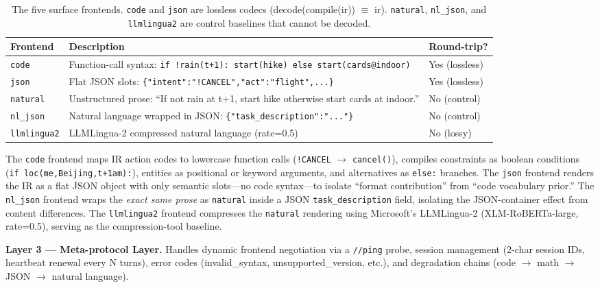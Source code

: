 \documentclass{article}
\begin{document}
\begin{table}[ht]
\centering
\small
\caption{The five surface frontends. \texttt{code} and \texttt{json} are lossless codecs (decode(compile(ir)) $\equiv$ ir). \texttt{natural}, \texttt{nl\_json}, and \texttt{llmlingua2} are control baselines that cannot be decoded.}
\begin{tabular}{lll}
\toprule
Frontend & Description & Round-trip? \\
\midrule
\texttt{code} & Function-call syntax: \texttt{if\ !rain(t+1):\ start(hike)\ else\ start(cards@indoor)} & Yes (lossless) \\
\texttt{json} & Flat JSON slots: \texttt{\{"intent":"!CANCEL","act":"flight",...\}} & Yes (lossless) \\
\texttt{natural} & Unstructured prose: ``If not rain at t+1, start hike otherwise start cards at indoor.'' & No (control) \\
\texttt{nl\_json} & Natural language wrapped in JSON: \texttt{\{"task\_description":"..."\}} & No (control) \\
\texttt{llmlingua2} & LLMLingua-2 compressed natural language (rate=0.5) & No (lossy) \\
\bottomrule
\end{tabular}
\end{table}


The \texttt{code} frontend maps IR action codes to lowercase function calls (\texttt{!CANCEL} $\to$ \texttt{cancel()}), compiles constraints as boolean conditions (\texttt{if\ loc(me,Beijing,t+1am):}), entities as positional or keyword arguments, and alternatives as \texttt{else:} branches. The \texttt{json} frontend renders the IR as a flat JSON object with only semantic slots---no code syntax---to isolate ``format contribution'' from ``code vocabulary prior.'' The \texttt{nl\_json} frontend wraps the \emph{exact same prose} as \texttt{natural} inside a JSON \texttt{task\_description} field, isolating the JSON-container effect from content differences. The \texttt{llmlingua2} frontend compresses the \texttt{natural} rendering using Microsoft's LLMLingua-2 (XLM-RoBERTa-large, rate=0.5), serving as the compression-tool baseline.



\textbf{Layer 3 --- Meta-protocol Layer.} Handles dynamic frontend negotiation via a \texttt{//ping} probe, session management (2-char session IDs, heartbeat renewal every N turns), error codes (invalid\_syntax, unsupported\_version, etc.), and degradation chains (code $\to$ math $\to$ JSON $\to$ natural language).
\end{document}
